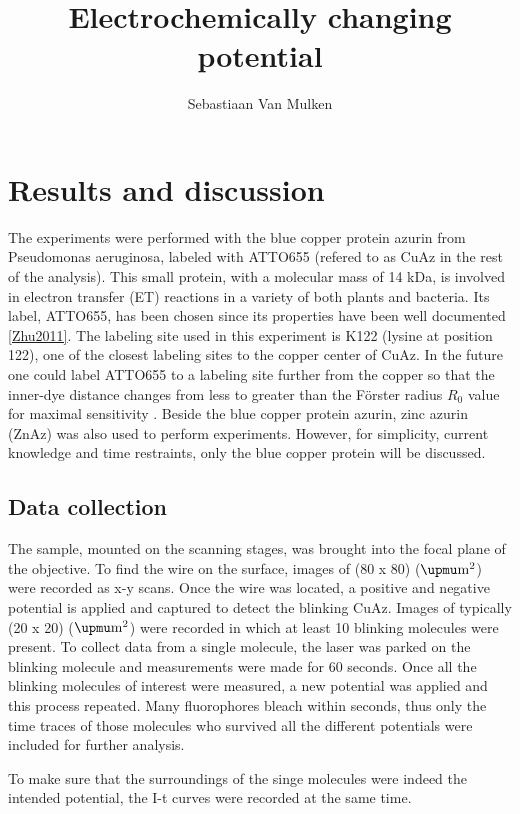\documentclass[twoside,single]{lion-msc}
\title{Electrochemically changing potential}
\author{Sebastiaan Van Mulken}
\begin{document}
\maketitle

\chapter{Results and discussion}

The experiments were performed with the blue copper protein azurin from Pseudomonas aeruginosa, labeled with ATTO655 (refered to as CuAz in the rest of the analysis). This small protein, with a molecular mass of 14 kDa, is involved in electron transfer (ET) reactions in a variety of both plants and bacteria. Its label, ATTO655, has been chosen since its properties have been well documented \ref{Zhu2011}. The labeling site used in this experiment is K122 (lysine at position 122), one of the closest labeling sites to the copper center of CuAz. In the future one could label ATTO655 to a labeling site further from the copper so that the inner-dye distance changes from less to greater than the F\"{o}rster radius $R_{0}$ value for maximal sensitivity \cite{Roy2008}. 
Beside the blue copper protein azurin, zinc azurin (ZnAz) was also used to perform experiments. However, for simplicity, current knowledge and time restraints, only the blue copper protein will be discussed.

\section*{Data collection} \label{data_coll}
The sample, mounted on the scanning stages, was brought into the focal plane of the objective. To find the wire on the surface, images of (80 x 80) ($\upmu \textup{m}^{2}$) were recorded as x-y scans. Once the wire was located, a positive and negative potential is applied and captured to detect the blinking CuAz. Images of typically (20 x 20) ($\upmu \textup{m}^{2}$) were recorded in which at least 10 blinking molecules were present. To collect data from a single molecule, the laser was parked on the blinking molecule and measurements were made for 60 seconds. Once all the blinking molecules of interest were measured, a new potential was applied and this process repeated. Many fluorophores bleach within seconds, thus only the time traces of those molecules who survived all the different potentials were included for further analysis. 

To make sure that the surroundings of the singe molecules were indeed the intended potential, the I-t curves were recorded at the same time.
\end{document}
